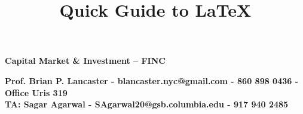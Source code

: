 \documentclass[10pt,landscape]{article}
\title{Quick Guide to LaTeX}
\begin{document}
\footnotesize





\newpage
	\begin{center}
	     \Large{\textbf{Capital Market \& Investment -- FINC}} \\
	\end{center}

	\begin{center}
		\textbf{Prof. Brian P. Lancaster - blancaster.nyc@gmail.com - 860 898 0436 - Office Uris 319}\\
		\textbf{TA: Sagar Agarwal - SAgarwal20@gsb.columbia.edu - 917 940 2485}
	\end{center}
\end{document}
